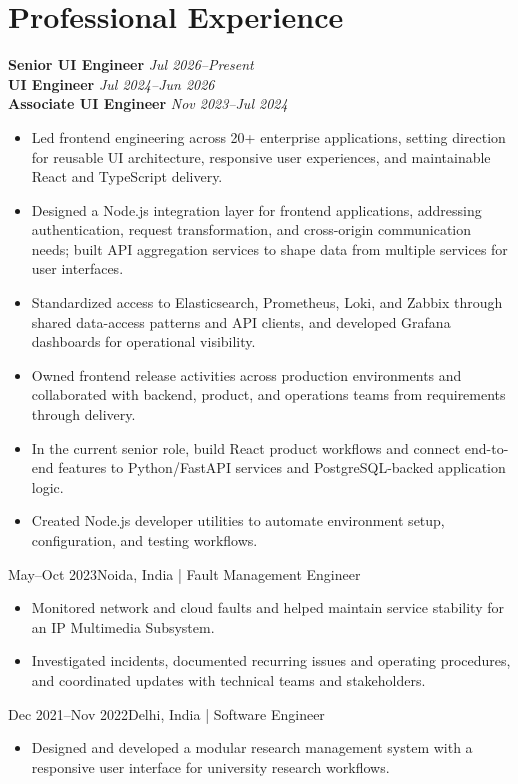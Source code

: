 \section{Professional Experience}

\textbf{Senior UI Engineer} \hfill \textit{Jul 2026--Present}\\
\textbf{UI Engineer} \hfill \textit{Jul 2024--Jun 2026}\\
\textbf{Associate UI Engineer} \hfill \textit{Nov 2023--Jul 2024}
\begin{itemize}
  \item Led frontend engineering across 20+ enterprise applications, setting
  direction for reusable UI architecture, responsive user experiences, and
  maintainable React and TypeScript delivery.
  \item Designed a Node.js integration layer for frontend applications,
  addressing authentication, request transformation, and cross-origin
  communication needs; built API aggregation services to shape data from
  multiple services for user interfaces.
  \item Standardized access to Elasticsearch, Prometheus, Loki, and Zabbix
  through shared data-access patterns and API clients, and developed Grafana
  dashboards for operational visibility.
  \item Owned frontend release activities across production environments and
  collaborated with backend, product, and operations teams from requirements
  through delivery.
  \item In the current senior role, build React product workflows and connect
  end-to-end features to Python/FastAPI services and PostgreSQL-backed
  application logic.
  \item Created Node.js developer utilities to automate environment setup,
  configuration, and testing workflows.
\end{itemize}

{May--Oct 2023}{Noida, India | Fault Management Engineer}
\begin{itemize}
  \item Monitored network and cloud faults and helped maintain service stability
  for an IP Multimedia Subsystem.
  \item Investigated incidents, documented recurring issues and operating
  procedures, and coordinated updates with technical teams and stakeholders.
\end{itemize}

{Dec 2021--Nov 2022}{Delhi, India | Software Engineer}
\begin{itemize}
  \item Designed and developed a modular research management system with a
  responsive user interface for university research workflows.
\end{itemize}
